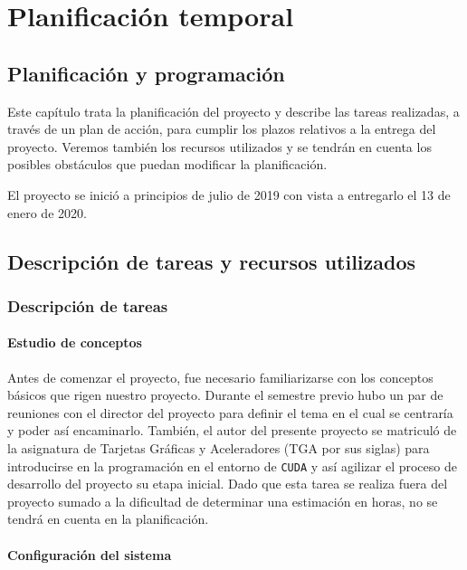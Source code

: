 \documentclass[titlepage,12pt]{report}
\begin{document}
\chapter{Planificación temporal}

\section{Planificación y programación}

Este capítulo trata la planificación del proyecto y describe las tareas realizadas, a través de un plan de acción, para cumplir los plazos relativos a la entrega del proyecto. Veremos también los recursos utilizados y se tendrán en cuenta los posibles obstáculos que puedan modificar la planificación.

El proyecto se inició a principios de julio de 2019 con vista a entregarlo el 13 de enero de 2020.

\section{Descripción de tareas y recursos utilizados}

\subsection{Descripción de tareas}

\subsubsection{Estudio de conceptos}

Antes de comenzar el proyecto, fue necesario familiarizarse con los conceptos básicos que rigen nuestro proyecto. Durante el semestre previo hubo un par de reuniones con el director del proyecto para definir el tema en el cual se centraría y poder así encaminarlo. También, el autor del presente proyecto se matriculó de la asignatura de Tarjetas Gráficas y Aceleradores (TGA por sus siglas) para introducirse en la programación en el entorno de \texttt{CUDA} y así agilizar el proceso de desarrollo del proyecto su etapa inicial. Dado que esta tarea se realiza fuera del proyecto sumado a la dificultad de determinar una estimación en horas, no se tendrá en cuenta en la planificación.

\subsubsection{Configuración del sistema}
\end{document}
